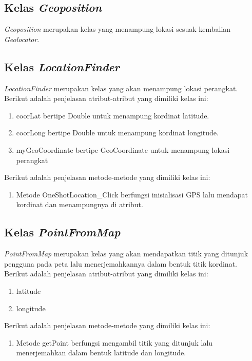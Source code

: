 \subsection{Kelas \textit{Geoposition}}
\label{lab:Kelas Geoposition}
\hspace{0.5cm} \textit{Geoposition} merupakan kelas yang menampung lokasi sesuak kembalian \textit{Geolocator}.

\subsection{Kelas \textit{LocationFinder}}
\label{lab:Kelas LocationFinder}
\hspace{0.5cm} \textit{LocationFinder} merupakan kelas yang akan menampung lokasi perangkat. Berikut adalah penjelasan atribut-atribut yang dimiliki kelas ini:
\begin{enumerate}
	\item coorLat bertipe Double untuk menampung kordinat latitude.
	\item coorLong bertipe Double untuk menampung kordinat longitude.
	\item myGeoCoordinate bertipe GeoCoordinate untuk menampung lokasi perangkat
\end{enumerate}

Berikut adalah penjelasan metode-metode yang dimiliki kelas ini:
\begin{enumerate}
	\item Metode OneShotLocation\_Click berfungsi inisialisasi GPS lalu mendapat kordinat dan menampungnya di atribut.
\end{enumerate}

\subsection{Kelas \textit{PointFromMap}}
\label{lab:Kelas PointFromMap}
\hspace{0.5cm} \textit{PointFromMap} merupakan kelas yang akan mendapatkan titik yang ditunjuk pengguna pada peta lalu menerjemahkannya dalam bentuk titik kordinat. Berikut adalah penjelasan atribut-atribut yang dimiliki kelas ini:
\begin{enumerate}
	\item latitude
	\item longitude
\end{enumerate}

Berikut adalah penjelasan metode-metode yang dimiliki kelas ini:
\begin{enumerate}
	\item Metode getPoint berfungsi mengambil titik yang ditunjuk lalu menerjemahkan dalam bentuk latitude dan longitude. 
\end{enumerate}

